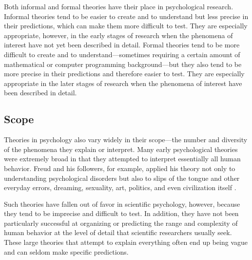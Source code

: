 Both informal and formal theories have their place in psychological research. Informal theories tend to be easier to create and to understand but less precise in their predictions, which can make them more difficult to test. They are especially appropriate, however, in the early stages of research when the phenomena of interest have not yet been described in detail. Formal theories tend to be more difficult to create and to understand---sometimes requiring a certain amount of mathematical or computer programming background---but they also tend to be more precise in their predictions and therefore easier to test. They are especially appropriate in the later stages of research when the phenomena of interest have been described in detail.

\subsection{Scope}

Theories in psychology also vary widely in their scope---the number and diversity of the phenomena they explain or interpret. Many early psychological theories were extremely broad in that they attempted to interpret essentially all human behavior. Freud and his followers, for example, applied his theory not only to understanding psychological disorders but also to slips of the tongue and other everyday errors, dreaming, sexuality, art, politics, and even civilization itself \citep{fine_history_1979}.

Such theories have fallen out of favor in scientific psychology, however, because they tend to be imprecise and difficult to test. In addition, they have not been particularly successful at organizing or predicting the range and complexity of human behavior at the level of detail that scientific researchers usually seek. These large theories that attempt to explain everything often end up being vague and can seldom make specific predictions.

